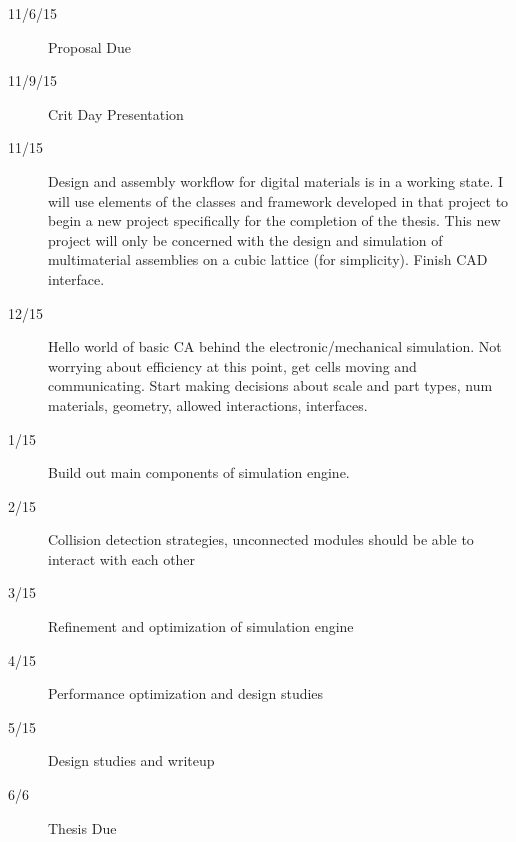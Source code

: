 {\begin{description}
  \item[11/6/15]\tabto{1.5cm}Proposal Due
  \item[11/9/15]\tabto{1.5cm}Crit Day Presentation
  \item[11/15]\tabto{1.5cm}Design and assembly workflow for digital materials is in a working state.  I will use elements of the classes and framework developed in that project to begin a new project specifically for the completion of the thesis.  This new project will only be concerned with the design and simulation of multimaterial assemblies on a cubic lattice (for simplicity).  Finish CAD interface.
  \item[12/15]\tabto{1.5cm}Hello world of basic CA behind the electronic/mechanical simulation.  Not worrying about efficiency at this point, get cells moving and communicating.  Start making decisions about scale and part types, num materials, geometry, allowed interactions, interfaces.
  \item[1/15]\tabto{1.5cm}Build out main components of simulation engine.
  \item[2/15]\tabto{1.5cm}Collision detection strategies, unconnected modules should be able to interact with each other
  \item[3/15]\tabto{1.5cm}Refinement and optimization of simulation engine
  \item[4/15]\tabto{1.5cm}Performance optimization and design studies
  \item[5/15]\tabto{1.5cm}Design studies and writeup
  \item[6/6]\tabto{1.5cm}Thesis Due
\end{description}

}
